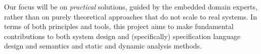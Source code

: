 Our focus will be on \emph{practical} solutions, guided by the
embedded domain experts, rather than on purely theoretical approaches
that do not scale to real systems.  In terms of both principles and
tools, this project aims to make fundamental contributions to both
system design and (specifically) specification language design and
semantics and static and dynamic analysis methods.